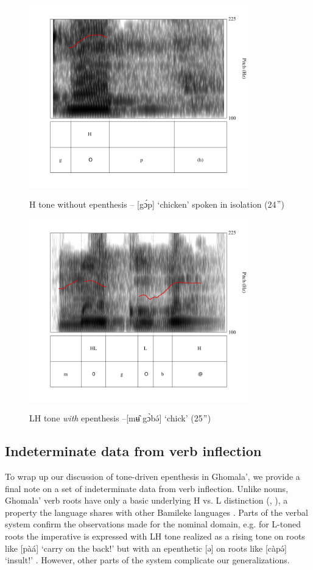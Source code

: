 \documentclass[output=paper,colorlinks,citecolor=brown,draft,draftmode]{langscibook}
\begin{document}
\begin{figure}
\caption{H tone without epenthesis -- [g\'ɔp] `chicken' spoken in isolation (24$"$)}
\includegraphics[width=9.5cm]{figures/fig5_AEG_gop.pdf}
\label{fig:baham1}
\end{figure}

\begin{figure}
\caption{LH tone \textit{with} epenthesis --[m\^{ʉ} g\`ɔb\'ə] `chick'  (25$"$)}
\includegraphics[width=9.5cm]{figures/fig6_AEG_mU_gObE.pdf}
\label{fig:baham2}
\end{figure}

\subsection{Indeterminate data from verb inflection}\label{sec:verbs}

To wrap up our discussion of tone-driven epenthesis in Ghomala', we  provide a final note on a set of indeterminate data from verb inflection. 
Unlike nouns, Ghomala' verb roots have  only a basic underlying H vs. L distinction  (\citealt[79]{nissim1972}, \citealt[78]{mba1997}), a property the language shares with other Bamileke languages \citep[62]{elias1984}. 
Parts of the verbal system confirm the observations made for the nominal domain, e.g. for L-toned roots the imperative is expressed with LH tone realized as a rising tone on roots like [pàá]
`carry on the back!' but with an epenthetic [ə] on roots like [càpə́]
`insult!' \citep[80]{nissim1972}.
However, other parts of the system complicate our generalizations. 
\end{document}
